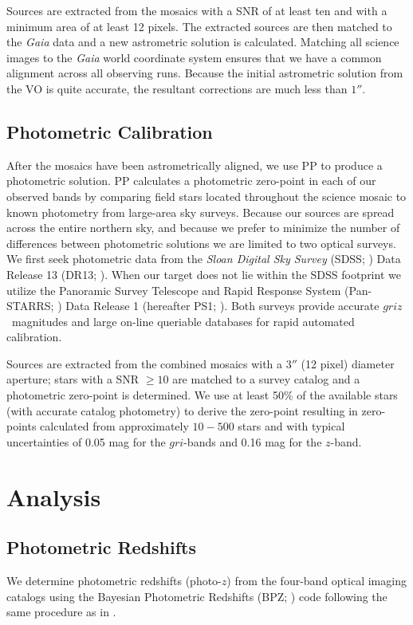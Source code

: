 \documentclass[apj, revtex4-1]{emulateapj}
\newcommand{\sdssg}{\hbox{$g$}}
\newcommand{\sdssr}{\hbox{$r$}}
\newcommand{\sdssi}{\hbox{$i$}}
\newcommand{\sdssz}{\hbox{$z$}}
\begin{document}
Sources are extracted from the mosaics with a SNR of at least ten and with a minimum area of at least 12 pixels. The extracted sources are then matched to the \textit{Gaia} data and a new astrometric solution is calculated. Matching all science images to the \textit{Gaia} world coordinate system ensures that we have a common alignment across all observing runs. Because the initial astrometric solution from the VO is quite accurate, the resultant corrections are much less than $1''$.

\subsection{Photometric Calibration}
After the mosaics have been astrometrically aligned, we use PP to produce a photometric solution. PP calculates a photometric zero-point in each of our observed bands by comparing field stars located throughout the science mosaic to known photometry from large-area sky surveys. Because our sources are spread across the entire northern sky, and because we prefer to minimize the number of differences between photometric solutions we are limited to two optical surveys. We first seek photometric data from the \textit{Sloan Digital Sky Survey} (SDSS; \citealt{York2000}) Data Release 13 (DR13; \citealt{Albareti2017}). When our target does not lie within the SDSS footprint we utilize the Panoramic Survey Telescope and Rapid Response System (Pan-STARRS; \citealt{Chambers2016}) Data Release 1 (hereafter PS1; \citealt{Flewelling2016}). Both surveys provide accurate \sdssg\sdssr\sdssi\sdssz\ magnitudes and large on-line queriable databases for rapid automated calibration.

Sources are extracted from the combined mosaics with a $3''$ (12 pixel) diameter aperture; stars with a SNR $\ge10$ are matched to a survey catalog and a photometric zero-point is determined. We use at least 50\% of the available stars (with accurate catalog photometry) to derive the zero-point resulting in zero-points calculated from approximately $10-500$ stars and with typical uncertainties of 0.05 mag for the \sdssg\sdssr\sdssi-bands and 0.16 mag for the \sdssz-band.

\section{Analysis}\label{sec:analysis}
\subsection{Photometric Redshifts}
We determine photometric redshifts (photo-$z$) from the four-band optical imaging catalogs using the Bayesian Photometric Redshifts (BPZ; \citealt{Benitez2000, Coe2006}) code following the same procedure as in \cite{Menanteau2009a}.
\end{document}
